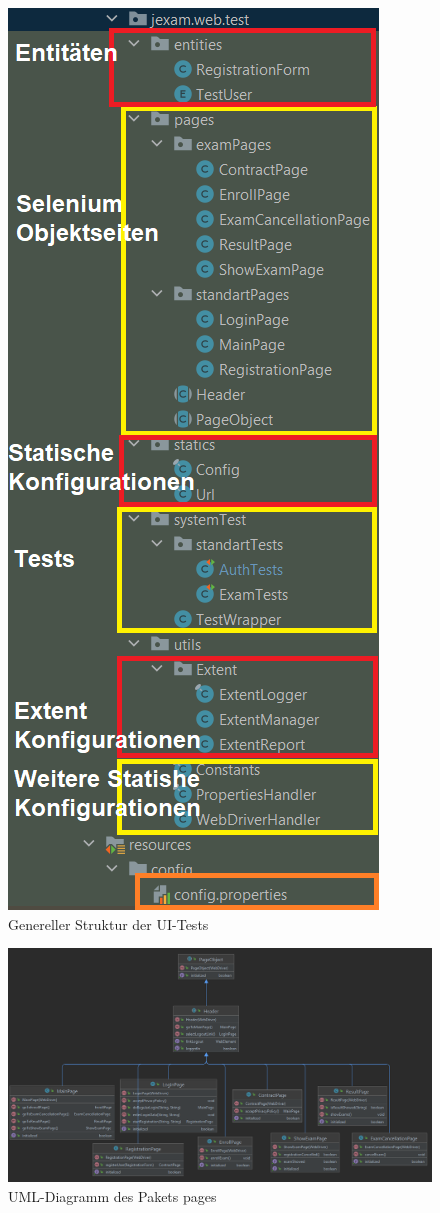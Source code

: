 \begin{figure}[H]
    \centering
    \includegraphics[scale=0.4]{images/ui-test}
    \caption{Genereller Struktur der UI-Tests} \label{fig:ui-test}
\end{figure}

\begin{figure}[H]
    \centering
    \includegraphics[scale=0.5]{images/pages_diagram}
    \caption{UML-Diagramm des Pakets pages} \label{fig:page-package}
\end{figure}

